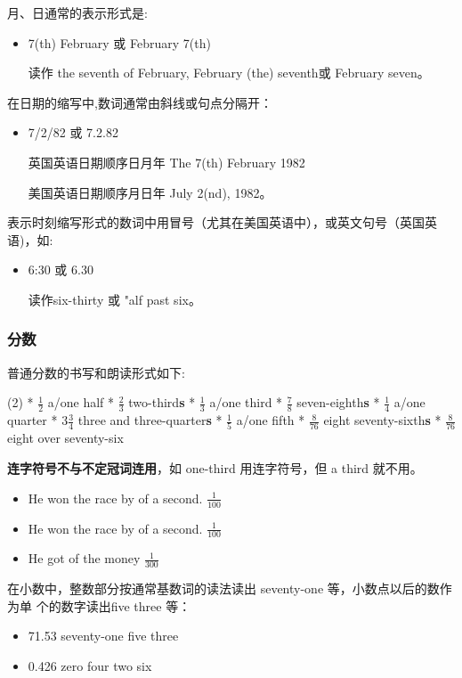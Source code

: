 月、日通常的表示形式是:
\begin{itemize}
\item 7(th) February 或 February 7(th)

  读作 the seventh of February, February (the) seventh或 February seven。
\end{itemize}

在日期的缩写中,数词通常由斜线或句点分隔开：
\begin{itemize}
\item 7/2/82 或 7.2.82

  英国英语日期顺序日月年 The 7(th) February 1982

  美国英语日期顺序月日年 July 2(nd), 1982。
\end{itemize}

表示时刻缩写形式的数词中用冒号（尤其在美国英语中），或英文句号（英国英语)，如:
\begin{itemize}
\item 6:30 或 6.30

  读作six-thirty 或 "alf past six。
\end{itemize}

\subsubsection{分数}

 普通分数的书写和朗读形式如下:
 \begin{taskitem}(2)
   * $\frac{1}{2}$ a/one half
   * $\frac{2}{3}$ two-third\textbf{s}
   * $\frac{1}{3}$ a/one third
   * $\frac{7}{8}$ seven-eighth\textbf{s}
   * $\frac{1}{4}$ a/one quarter
   * $3\frac{3}{4}$ three and three-quarter\textbf{s}
   * $\frac{1}{5}$ a/one fifth
   * $\frac{8}{76}$ eight seventy-sixth\textbf{s}
   * $\frac{8}{76}$ eight over seventy-six
 \end{taskitem}

\textbf{连字符号不与不定冠词连用}，如 one-third 用连字符号，但 a third 就不用。

\begin{itemize}
\item He won the race by  of a second. $\frac{1}{100}$
\item He won the race by  of a second. $\frac{1}{100}$
\item He got  of the money $\frac{1}{300}$
\end{itemize}

在小数中，整数部分按通常基数词的读法读出 seventy-one 等，小数点以后的数作为单
个的数字读出five three 等：
 \begin{itemize}
 \item 71.53 seventy-one  five three

 \item 0.426  zero  four two six
 \end{itemize}

